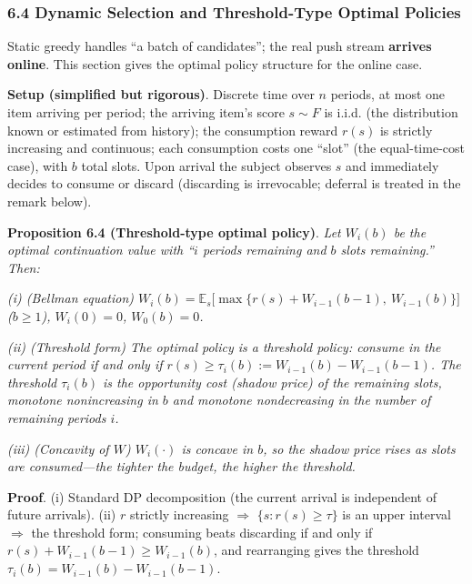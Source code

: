 \documentclass[
  11pt]{article}
\begin{document}
\subsubsection{6.4 Dynamic Selection and Threshold-Type Optimal
Policies}\label{dynamic-selection-and-threshold-type-optimal-policies}

Static greedy handles ``a batch of candidates''; the real push stream
\textbf{arrives online}. This section gives the optimal policy structure
for the online case.

\textbf{Setup (simplified but rigorous)}. Discrete time over \(n\)
periods, at most one item arriving per period; the arriving item's score
\(s \sim F\) is i.i.d. (the distribution known or estimated from
history); the consumption reward \(r(s)\) is strictly increasing and
continuous; each consumption costs one ``slot'' (the equal-time-cost
case), with \(b\) total slots. Upon arrival the subject observes \(s\)
and immediately decides to consume or discard (discarding is
irrevocable; deferral is treated in the remark below).

\textbf{Proposition 6.4 (Threshold-type optimal policy)}. \emph{Let
\(W_i(b)\) be the optimal continuation value with ``\(i\) periods
remaining and \(b\) slots remaining.'' Then:}

\emph{(i) (Bellman equation)
\(W_i(b) = \mathbb{E}_s\big[\max\{r(s) + W_{i-1}(b-1),\ W_{i-1}(b)\}\big]\)
(\(b \ge 1\)), \(W_i(0) = 0\), \(W_0(b) = 0\).}

\emph{(ii) (Threshold form) The optimal policy is a threshold policy:
consume in the current period if and only if
\(r(s) \ge \tau_i(b) := W_{i-1}(b) - W_{i-1}(b-1)\). The threshold
\(\tau_i(b)\) is the opportunity cost (shadow price) of the remaining
slots, monotone nonincreasing in \(b\) and monotone nondecreasing in the
number of remaining periods \(i\).}

\emph{(iii) (Concavity of \(W\)) \(W_i(\cdot)\) is concave in \(b\), so
the shadow price rises as slots are consumed---the tighter the budget,
the higher the threshold.}

\textbf{Proof}. (i) Standard DP decomposition (the current arrival is
independent of future arrivals). (ii) \(r\) strictly increasing
\(\Rightarrow\) \(\{s: r(s) \ge \tau\}\) is an upper interval
\(\Rightarrow\) the threshold form; consuming beats discarding if and
only if \(r(s) + W_{i-1}(b-1) \ge W_{i-1}(b)\), and rearranging gives
the threshold \(\tau_i(b) = W_{i-1}(b) - W_{i-1}(b-1)\).
\end{document}
